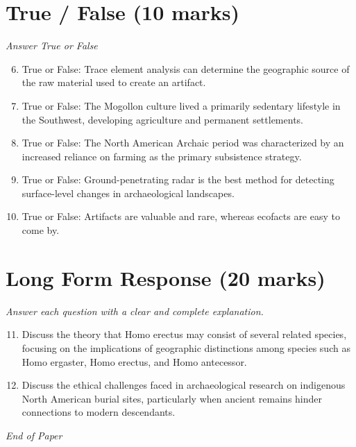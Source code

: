 \documentclass[12pt]{article}
\begin{document}
\section*{True / False (10 marks)}
\textit{Answer True or False}
\begin{enumerate}[label=\arabic*.]
\setcounter{enumi}{5}
\item True or False: Trace element analysis can determine the geographic source of the raw material used to create an artifact.
\item True or False: The Mogollon culture lived a primarily sedentary lifestyle in the Southwest, developing agriculture and permanent settlements.
\item True or False: The North American Archaic period was characterized by an increased reliance on farming as the primary subsistence strategy.
\item True or False: Ground-penetrating radar is the best method for detecting surface-level changes in archaeological landscapes.
\item True or False: Artifacts are valuable and rare, whereas ecofacts are easy to come by.
\end{enumerate}

\section*{Long Form Response (20 marks)}
\textit{Answer each question with a clear and complete explanation.}
\begin{enumerate}[label=\arabic*.]
\setcounter{enumi}{10}
\item Discuss the theory that Homo erectus may consist of several related species, focusing on the implications of geographic distinctions among species such as Homo ergaster, Homo erectus, and Homo antecessor.
\item Discuss the ethical challenges faced in archaeological research on indigenous North American burial sites, particularly when ancient remains hinder connections to modern descendants.
\end{enumerate}

\vfill
\noindent\textit{End of Paper}
\end{document}

